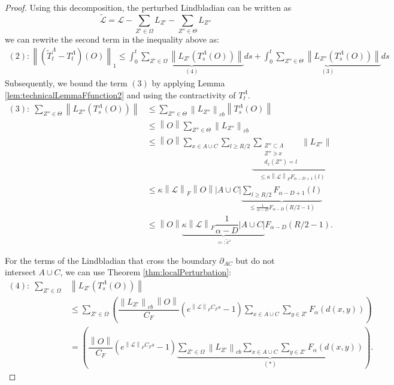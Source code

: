 \documentclass[11pt]{article}
\numberwithin{equation}{section}
\numberwithin{figure}{section}
\numberwithin{table}{section}
\theoremstyle{definition}
\theoremstyle{plain}
\theoremstyle{remark}
\newcommand{\Li}{\mathcal{L}}
\newcommand{\LL}{\widetilde{\Li}}
\newcommand{\La}{\Lambda}
\newcommand{\T}{T^\Lambda}
\newcommand{\TT}{\widetilde{T}^\Lambda}
\newcommand{\norm}[1]{\left\lVert#1\right\rVert}
\newcommand{\normm}[2]{\left\lVert#1\right\rVert_{#2}}
\newcommand{\abs}[1]{\left \vert#1\right\vert}
\begin{document}
\begin{proof}
    Using this decomposition, the perturbed Lindbladian can be written as
     \begin{equation}
         \LL=\Li -\sum_{Z'\in \Omega}L_{Z'}-\sum_{Z''\in \Theta}L_{Z''}
     \end{equation}
    we can rewrite the second term in the inequality above as:
     \begin{multline}
        (2):\normm{(\TT_t-\T_t)(O)}{1}\leq \int_0^t\underbrace{\sum_{Z'\in \Omega} \norm{L_{Z'}(\T_s(O))}}_{(4)}ds+\int_0^t\underbrace{\sum_{Z''\in \Theta} \norm{L_{Z''}(\T_s(O))}}_{(3)}ds
        \label{eq:(2)}
     \end{multline}
 Subsequently, we bound the term $(3)$ by applying Lemma \ref{lem:technicalLemmaFfunction2} and using the contractivity of $\T_t$.  
\begin{align}
(3):\;\sum_{Z''\in \Theta} \norm{L_{Z''}(\T_s(O))} &\le \sum_{Z''\in \Theta} \normm{L_{Z''}}{cb}\norm{\T_s(O)} \\
&\le \norm{O}\sum_{Z''\in \Theta} \normm{L_{Z''}}{cb} \nonumber\\
&\le \norm{O}\sum_{x\in A\cup C}\sum_{l\ge R/2}\underbrace{\sum_{\substack{Z''\subset \La \\ Z''\ni x \\ d_x(Z'')=l}}\norm{L_{Z''}}}_{\le \kappa \normm{\Li}{F} F_{\alpha-D+1}(l)} \nonumber\\
&\le \kappa \normm{\Li}{F}\norm{O}\abs{A\cup C}\underbrace{\sum_{l\ge R/2} F_{\alpha-D+1}(l)}_{\le \frac{1}{\alpha-D}F_{\alpha-D}(R/2-1)} \nonumber\\
&\le \norm{O}\underbrace{\kappa \normm{\Li}{F}\dfrac{1}{\alpha-D}\abs{A\cup C}}_{=:\tilde{c}'} F_{\alpha-D}(R/2-1). \nonumber
\end{align}
     
     For the terms of the Lindbladian that cross the boundary $\partial_{AC}$ but do not intersect $A\cup C$, we can use Theorem \ref{thm:localPerturbation}:
    \begin{align}
    (4):\;\sum_{Z'\in \Omega} & \norm{L_{Z'}(\T_s(O))}\nonumber \\
    &\nonumber \le \sum_{Z'\in \Omega}\left( \dfrac{\normm{L_{Z'}}{cb}\,\norm{O}}{C_F}\left( e^{\normm{\Li}{F} C_F s}-1\right)\sum_{x\in A\cup C}\sum_{y\in Z'}F_\alpha(d(x,y))\right) \\
    &= \left( \dfrac{\norm{O}}{C_F}\left( e^{\normm{\Li}{F} C_F s}-1\right)\underbrace{\sum_{Z'\in \Omega}\normm{L_{Z'}}{cb}\sum_{x\in A\cup C}\sum_{y\in Z'}F_\alpha(d(x,y))}_{(*)}\right).
    \label{eq:termsCrossingBoundary}
    \end{align}
    

\end{proof}
\end{document}
